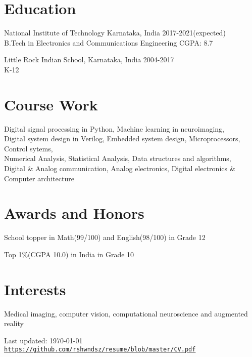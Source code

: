\documentclass[letterpaper]{article}
\def\footerlink{https://github.com/rshwndsz/resume/blob/master/CV.pdf}
\renewenvironment{itemize}{
  \begin{list}{}{
    \setlength{\leftmargin}{1.5em}
  }
}{
  \end{list}
}
\newcommand{\datefont}[1]{\textcolor{black!80}{\small{#1}}}
\begin{document}
\section*{Education}
  \begin{itemize}
    \item National Institute of Technology Karnataka, India\hfill
    \datefont{2017-2021(expected)}
    \\
    \datefont{B.Tech in Electronics and Communications Engineering}
    \hfill{\datefont{CGPA: 8.7}}

    \item Little Rock Indian School, Karnataka, India\hfill
    \datefont{2004-2017}
    \\
    \datefont{K-12}
  \end{itemize}



\section*{Course Work}
  \begin{itemize}
    \item  Digital signal processing in Python, Machine learning in neuroimaging, \\
    Digital system design in Verilog, Embedded system design,
    Microprocessors, Control sytems,\\
    Numerical Analysis, Statistical Analysis, Data structures and algorithms, \\
    Digital \& Analog communication, Analog electronics, Digital electronics \& Computer architecture
  \end{itemize}


\section*{Awards and Honors}
\begin{itemize}
  \item School topper in Math(99/100) and English(98/100) in Grade 12
  \item Top 1\%(CGPA 10.0) in India in Grade 10
\end{itemize}


\section*{Interests}
  \begin{itemize}
    \item Medical imaging, computer vision, computational neuroscience and augmented reality
  \end{itemize}


\bigskip
\begin{center}
  \begin{footnotesize}
    Last updated: \today \\
    \href{\footerlink}{\texttt{\footerlink}}
  \end{footnotesize}
\end{center}
\end{document}

